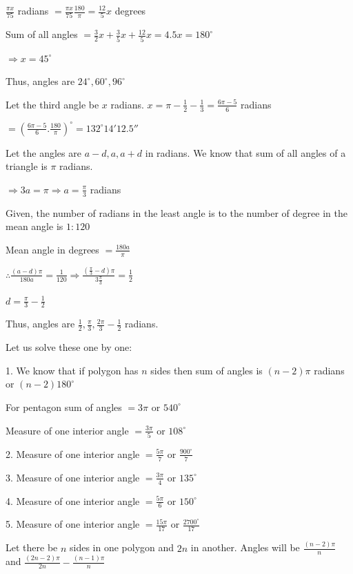     $\frac{\pi x}{75}$ radians $= \frac{\pi x}{75}\frac{180}{\pi} = \frac{12}{5}x$ degrees

    Sum of all angles $= \frac{3}{2}x + \frac{3}{5}x + \frac{12}{5}x = 4.5x = 180^\circ$

    $\Rightarrow x = 45^\circ$

    Thus, angles are $24^\circ, 60^\circ, 96^\circ$
\item Let the third angle be $x$ radians. $x = \pi - \frac{1}{2} - \frac{1}{3} = \frac{6\pi - 5}{6}$ radians

    $= \left(\frac{6\pi - 5}{6}. \frac{180}{\pi}\right)^\circ = 132^\circ14'12.5''$
\item Let the angles are $a - d, a, a + d$ in radians. We know that sum of all angles of a triangle is $\pi$ radians.

    $\Rightarrow 3a = \pi \Rightarrow a = \frac{\pi}{3}$ radians

    Given, the number of radians in the least angle is to the number of degree in the mean angle is $1:120$

    Mean angle in degrees $= \frac{180a}{\pi}$

    $\therefore \frac{(a - d)\pi}{180a} = \frac{1}{120} \Rightarrow \frac{(\frac{\pi}{3} - d)\pi}{3\frac{\pi}{3}} =
    \frac{1}{2}$

    $d = \frac{\pi}{3} - \frac{1}{2}$

    Thus, angles are $\frac{1}{2}, \frac{\pi}{3}, \frac{2\pi}{3}- \frac{1}{2}$ radians.
\item Let us solve these one by one:

    1. We know that if polygon has $n$ sides then sum of angles is $(n - 2)\pi$ radians or $(n - 2)180^\circ$

       For pentagon sum of angles $= 3\pi$ or $540^\circ$

       Measure of one interior angle $= \frac{3\pi}{5}$ or $108^\circ$

    2. Measure of one interior angle $= \frac{5\pi}{7}$ or $\frac{900^\circ}{7}$


    3. Measure of one interior angle $= \frac{3\pi}{4}$ or $135^\circ$

    4. Measure of one interior angle $= \frac{5\pi}{6}$ or $150^\circ$

    5. Measure of one interior angle $= \frac{15\pi}{17}$ or $\frac{2700^\circ}{17}$
\item Let there be $n$ sides in one polygon and $2n$ in another. Angles will be $\frac{(n - 2)\pi}{n}$ and
    $\frac{(2n - 2)\pi}{2n} - \frac{(n - 1)\pi}{n}$

